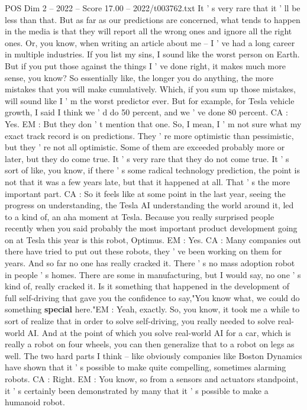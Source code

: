 \begin{textsample}{POS Dim 2 – 2022 – Score 17.00 – 2022/t003762.txt}
It ' s very rare that it ' ll be less than that.
But as far as our predictions are concerned, what tends to happen in the media is that they will report all the wrong ones and ignore all the right ones.
Or, you know, when writing an article about me -- I ' ve had a long career in multiple industries.
If you list my sins, I sound like the worst person on Earth.
But if you put those against the things I ' ve done right, it makes much more sense, you know?
So essentially like, the longer you do anything, the more mistakes that you will make cumulatively.
Which, if you sum up those mistakes, will sound like I ' m the worst predictor ever.
But for example, for Tesla vehicle growth, I said I think we ' d do 50 percent, and we ' ve done 80 percent.
CA : Yes.
EM : But they don ' t mention that one.
So, I mean, I ' m not sure what my exact track record is on predictions.
They ' re more optimistic than pessimistic, but they ' re not all optimistic.
Some of them are exceeded probably more or later, but they do come true.
It ' s very rare that they do not come true.
It ' s sort of like, you know, if there ' s some radical technology prediction, the point is not that it was a few years late, but that it happened at all.
That ' s the more important part.
CA : So it feels like at some point in the last year, seeing the progress on understanding, the Tesla AI understanding the world around it, led to a kind of, an aha moment at Tesla.
Because you really surprised people recently when you said probably the most important product development going on at Tesla this year is this robot, Optimus.
EM : Yes.
CA : Many companies out there have tried to put out these robots, they ' ve been working on them for years.
And so far no one has really cracked it.
There ' s no mass adoption robot in people ' s homes.
There are some in manufacturing, but I would say, no one ' s kind of, really cracked it.
Is it something that happened in the development of full self-driving that gave you the confidence to say,"You know what, we could do something \textbf{special} here."EM : Yeah, exactly.
So, you know, it took me a while to sort of realize that in order to solve self-driving, you really needed to solve real-world AI.
And at the point of which you solve real-world AI for a car, which is really a robot on four wheels, you can then generalize that to a robot on legs as well.
The two hard parts I think -- like obviously companies like Boston Dynamics have shown that it ' s possible to make quite compelling, sometimes alarming robots.
CA : Right.
EM : You know, so from a sensors and actuators standpoint, it ' s certainly been demonstrated by many that it ' s possible to make a humanoid robot.

\end{textsample}
